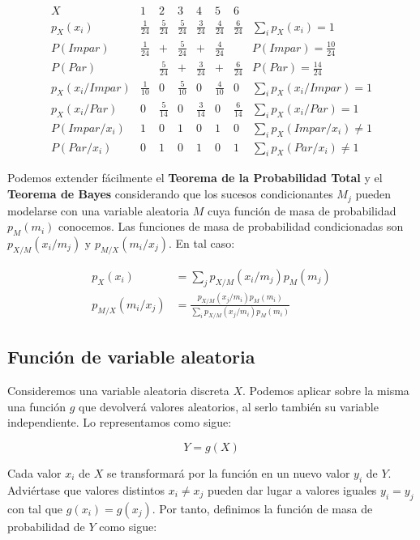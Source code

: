 \documentclass[11pt]{article}
\begin{document}
\[
\begin{array}{c|cccccc|c}
  X & 1 & 2 & 3 & 4 & 5 & 6 &  \\ 
  \hline
  p_X(x_i) & \frac{1}{24} & \frac{5}{24} & \frac{5}{24} & \frac{3}{24} & \frac{4}{24} & \frac{6}{24} & \sum_i p_X(x_i)=1 \\
  \hline
  P(Impar) & \frac{1}{24} & + & \frac{5}{24} & + & \frac{4}{24} &  & P(Impar) = \frac{10}{24} \\
  P(Par)  &  & \frac{5}{24} & + & \frac{3}{24} & + & \frac{6}{24} & P(Par) = \frac{14}{24}\\
  \hline
  p_X(x_i/Impar) & \frac{1}{10} & 0 & \frac{5}{10} & 0 & \frac{4}{10} & 0 & \sum_i p_X(x_i/Impar)=1 \\
  p_X(x_i/Par) & 0 & \frac{5}{14} & 0 & \frac{3}{14} & 0 & \frac{6}{14} & \sum_i p_X(x_i/Par)=1\\
  \hline
  P(Impar/x_i) & 1 & 0 & 1 & 0 & 1 & 0 & \sum_i p_X(Impar/x_i)\neq 1\\
  P(Par/x_i) & 0 & 1 & 0 & 1 & 0 & 1 & \sum_i p_X(Par/x_i)\neq 1
 \end{array}
\]

    Podemos extender fácilmente el \textbf{Teorema de la Probabilidad Total}
y el \textbf{Teorema de Bayes} considerando que los sucesos
condicionantes \(M_j\) pueden modelarse con una variable aleatoria \(M\)
cuya función de masa de probabilidad \(p_M(m_i)\) conocemos. Las
funciones de masa de probabilidad condicionadas son \(p_{X/M}(x_i/m_j)\)
y \(p_{M/X}(m_i/x_j)\). En tal caso:

\begin{align*}
p_X(x_i) &= \sum_j p_{X/M}(x_i/m_j)p_M(m_j)\\
p_{M/X}(m_i/x_j) &= \frac{p_{X/M}(x_j/m_i)p_M(m_i)}{\sum_i p_{X/M}(x_j/m_i)p_M(m_i)}
\end{align*}

    \hypertarget{funciuxf3n-de-variable-aleatoria}{%
\subsection*{Función de variable
aleatoria}\label{funciuxf3n-de-variable-aleatoria}}

Consideremos una variable aleatoria discreta \(X\). Podemos aplicar
sobre la misma una función \(g\) que devolverá valores aleatorios, al
serlo también su variable independiente. Lo representamos como sigue:

\[Y = g(X)\]

Cada valor \(x_i\) de \(X\) se transformará por la función en un nuevo
valor \(y_i\) de \(Y\). Adviértase que valores distintos
\(x_i \neq x_j\) pueden dar lugar a valores iguales \(y_i = y_j\) con
tal que \(g(x_i)=g(x_j)\). Por tanto, definimos la función de masa de
probabilidad de \(Y\) como sigue:
\end{document}
